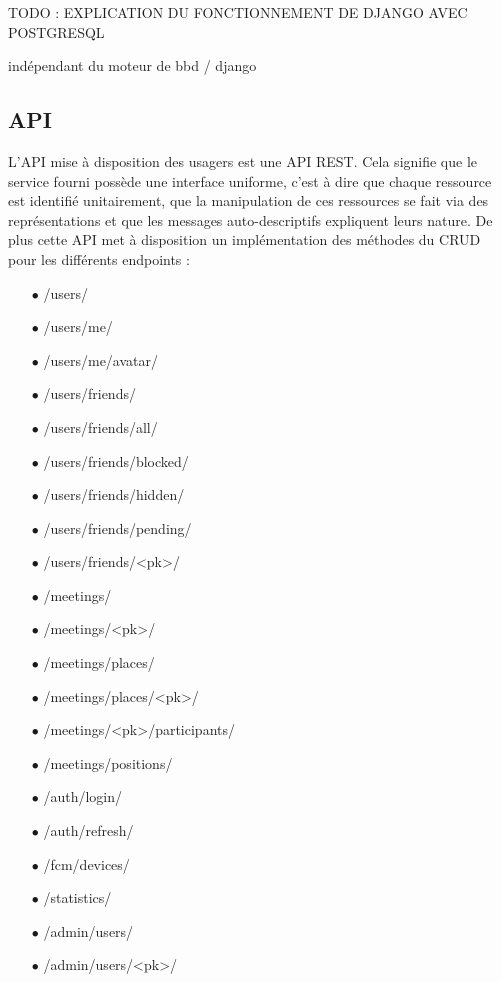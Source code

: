 \documentclass[french]{article}
\begin{document}
	
	
	
	 
	TODO : EXPLICATION DU FONCTIONNEMENT DE DJANGO AVEC POSTGRESQL
	
	
	
	indépendant du moteur de bbd / django
	
	
	\subsection{API}
	
	L'API mise à disposition des usagers est une API REST. Cela signifie que le service fourni possède une interface uniforme, c'est à dire que chaque ressource est identifié unitairement, que la manipulation de ces ressources se fait via des représentations et que les messages auto-descriptifs expliquent leurs nature. De plus cette API met à disposition un implémentation des méthodes du CRUD pour les différents endpoints : 
	\begin{itemize}
		\item[$\bullet$] /users/
		\item[$\bullet$] /users/me/
		\item[$\bullet$] /users/me/avatar/
		\item[$\bullet$] /users/friends/
		\item[$\bullet$] /users/friends/all/
		\item[$\bullet$] /users/friends/blocked/
		\item[$\bullet$] /users/friends/hidden/
		\item[$\bullet$] /users/friends/pending/
		\item[$\bullet$] /users/friends/<pk>/
		\item[$\bullet$] /meetings/
		\item[$\bullet$] /meetings/<pk>/
		\item[$\bullet$] /meetings/places/
		\item[$\bullet$] /meetings/places/<pk>/
		\item[$\bullet$] /meetings/<pk>/participants/
		\item[$\bullet$] /meetings/positions/
		\item[$\bullet$] /auth/login/
		\item[$\bullet$] /auth/refresh/
		\item[$\bullet$] /fcm/devices/
		\item[$\bullet$] /statistics/
		\item[$\bullet$] /admin/users/
		\item[$\bullet$] /admin/users/<pk>/
	\end{itemize}
		
\end{document}
